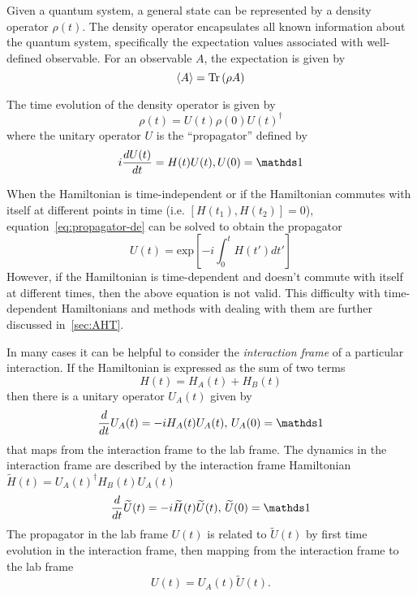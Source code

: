 Given a quantum system, a general state can be represented by a density operator $\rho(t)$. The density operator encapsulates all known information about the quantum system, specifically the expectation values associated with well-defined observable. For an observable $A$, the expectation is given by
\begin{equation}\label{eq:measure}
    \langle A \rangle = \text{Tr}\left( \rho A \right)
\end{equation}

The time evolution of the density operator is given by
\begin{equation}\label{eq:density-time}
    \rho(t) = U(t) \rho(0) U(t)^\dagger
\end{equation}
where the unitary operator $U$ is the ``propagator'' defined by
\begin{equation}\label{eq:propagator-de}
    i \ddt{U(t)} = H(t) U(t), U(0) = \identity
\end{equation}

When the Hamiltonian is time-independent or if the Hamiltonian commutes with itself at different points in time (i.e. $[H(t_1), H(t_2)] = 0$), equation~\ref{eq:propagator-de} can be solved to obtain the propagator
\begin{equation}\label{eq:propagator-ti}
    U(t) = \text{exp}\left[ {-i \int_0^t H(t') dt'} \right]
\end{equation}
However, if the Hamiltonian is time-dependent and doesn't commute with itself at different times, then the above equation is not valid. This difficulty with time-dependent Hamiltonians and methods with dealing with them are further discussed in~\ref{sec:AHT}.

In many cases it can be helpful to consider the \emph{interaction frame} of a particular interaction. If the Hamiltonian is expressed as the sum of two terms
\[
H(t) = H_A(t) + H_B(t)
\]
then there is a unitary operator $U_A(t)$ given by
\begin{equation}\label{eq:interaction-propagator}
    \frac{d}{dt} U_A(t) = -i H_A(t) U_A(t), \, U_A(0) = \identity
\end{equation}
that maps from the interaction frame to the lab frame.
The dynamics in the interaction frame are described by the interaction frame Hamiltonian $\widetilde{H}(t) = {U_A(t)}^{\dagger} H_B(t)U_A(t)$
\[
\frac{d}{dt}\widetilde{U}(t) = -i \widetilde{H}(t)\widetilde{U}(t),\, \widetilde{U}(0) = \identity
\]
The propagator in the lab frame $U(t)$ is related to $\widetilde{U}(t)$ by first time evolution in the interaction frame, then mapping from the interaction frame to the lab frame
\[
U(t) = U_A(t)\widetilde{U}(t).
\]


